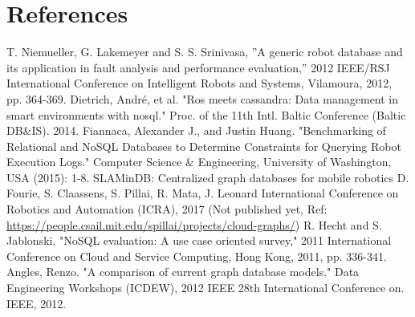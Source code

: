 \documentclass[12pt]{article}
\begin{document}
\section{References}
\begin{thebibliography}{9}
T. Niemueller, G. Lakemeyer and S. S. Srinivasa, ”A generic robot database and its application in fault analysis and performance evaluation,” 2012 IEEE/RSJ International Conference on Intelligent Robots and Systems, Vilamoura, 2012, pp. 364-369.
Dietrich, André, et al. "Ros meets cassandra: Data management in smart environments with nosql." Proc. of the 11th Intl. Baltic Conference (Baltic DB\&IS). 2014.
Fiannaca, Alexander J., and Justin Huang. "Benchmarking of Relational and NoSQL Databases to Determine Constraints for Querying Robot Execution Logs." Computer Science \& Engineering, University of Washington, USA (2015): 1-8.
SLAMinDB: Centralized graph databases for mobile robotics
D. Fourie, S. Claassens, S. Pillai, R. Mata, J. Leonard
International Conference on Robotics and Automation (ICRA), 2017 (Not published yet, Ref: \href{https://people.csail.mit.edu/spillai/projects/cloud-graphs/}{https://people.csail.mit.edu/spillai/projects/cloud-graphs/})
R. Hecht and S. Jablonski, "NoSQL evaluation: A use case oriented survey," 2011 International Conference on Cloud and Service Computing, Hong Kong, 2011, pp. 336-341.
Angles, Renzo. "A comparison of current graph database models." Data Engineering Workshops (ICDEW), 2012 IEEE 28th International Conference on. IEEE, 2012.
\end{thebibliography}
\end{document}
